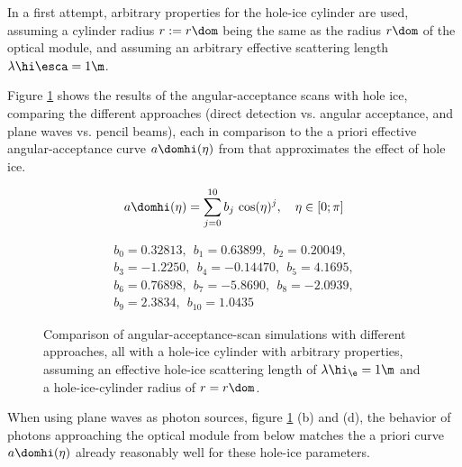 In a first attempt, arbitrary properties for the hole-ice cylinder are used, assuming a cylinder radius $r:=r\dom$ being the same as the radius $r\dom$ of the optical module, and assuming an arbitrary effective scattering length $\lambda\hi\esca = 1\m$.


Figure \ref{fig:eVapie9t} shows the results of the angular-acceptance scans with hole ice, comparing the different approaches (direct detection vs. angular acceptance, and plane waves vs. pencil beams), each in comparison to the a priori effective angular-acceptance curve $a\domhi(\eta)$ from \cite{icepaper} that approximates the effect of hole ice.

\begin{equation}
  a\domhi(\eta) = \sum_{j = 0}^{10} b_j\,\cos(\eta)^j, \ \ \ \eta \in [0; \pi]
  \label{eq:aholeice}
\end{equation}

\begin{gather*}
  b_0 = 0.32813, \ \ b_1 = 0.63899, \ \ b_2 = 0.20049, \\
  b_3 = -1.2250, \ \ b_4 = -0.14470, \ \ b_5 = 4.1695, \\
  b_6 = 0.76898, \ \ b_7 = -5.8690, \ \ b_8 = -2.0939, \\
  b_9 = 2.3834, \ \ b_{10} = 1.0435
\end{gather*}

\begin{figure}[htbp]
  \hfill
  \hfill
  \hfill
  \hfill
  \caption{Comparison of angular-acceptance-scan simulations with different approaches, all with a hole-ice cylinder with arbitrary properties, assuming an effective hole-ice scattering length of $\lambda\hi_\e=1\m$ and a hole-ice-cylinder radius of $r=r\dom$.}
  \label{fig:eVapie9t}
\end{figure}

When using plane waves as photon sources, figure \ref{fig:eVapie9t} (b) and (d), the behavior of photons approaching the optical module from below matches the a priori curve $a\domhi(\eta)$ \cite{icepaper} already reasonably well for these hole-ice parameters.

